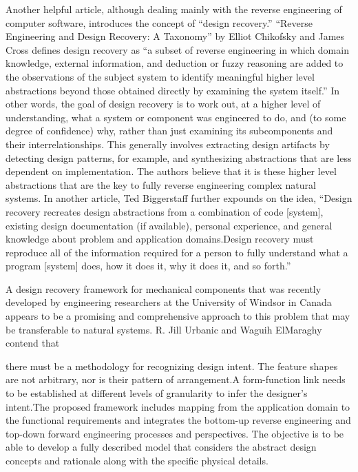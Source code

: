 Another helpful article, although dealing mainly with the reverse
engineering of computer software, introduces the concept of ``design
recovery.'' ``Reverse Engineering and Design Recovery: A Taxonomy'' by
Elliot Chikofsky and James Cross defines design recovery as ``a subset
of reverse engineering in which domain knowledge, external information,
and deduction or fuzzy reasoning are added to the observations of the
subject system to identify meaningful higher level abstractions beyond
those obtained directly by examining the system
itself.''\citep[][p.~15]{chikofskycross1990}
In other words, the goal of design
recovery is to work out, at a higher level of understanding, what a
system or component was engineered to do, and (to some degree of
confidence) why, rather than just examining its subcomponents and their
interrelationships. This generally involves extracting design
artifacts by detecting design patterns, for example, and synthesizing
abstractions that are less dependent on implementation. The authors
believe that it is these higher level abstractions that are the key to
fully reverse engineering complex natural systems. In another article,
Ted Biggerstaff further expounds on the idea, ``Design recovery
recreates design abstractions from a combination of code [system],
existing design documentation (if available), personal experience, and
general knowledge about problem and application domains.{\jdots}Design recovery
must reproduce all of the information required for a person to fully
understand what a program [system] does, how it does it, why it does
it, and so forth.''\citep[][p.~36]{biggerstaff1989}

A design recovery framework for mechanical components that was recently
developed by engineering researchers at the University of Windsor in
Canada appears to be a promising and comprehensive approach to this
problem that may be transferable to natural systems. R. Jill Urbanic
and Waguih ElMaraghy contend that 

\begin{quoting}
there must be a methodology for
recognizing design intent. The feature shapes are not arbitrary, nor is
their pattern of arrangement.{\jdots}A form-function link needs to be
established at different levels of granularity to infer the designer’s
intent.{\jdots}The proposed framework includes mapping from the application
domain to the functional requirements and integrates the bottom-up
reverse engineering and top-down forward engineering processes and
perspectives. The objective is to be able to develop a fully described
model that considers the abstract design concepts and rationale along
with the specific physical details. \citep[][p.~195]{urbanicelmaraghy2009}
\end{quoting}


